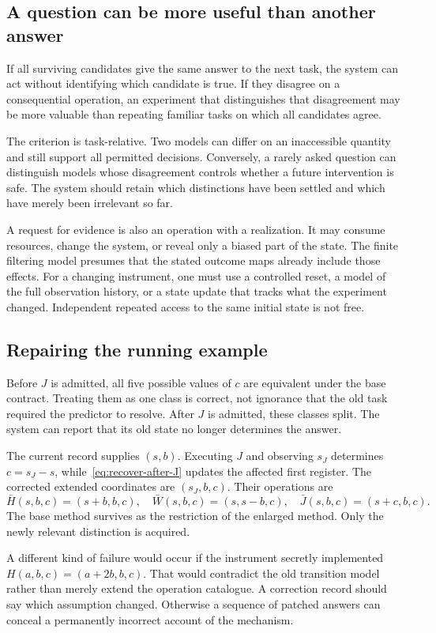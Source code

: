 \documentclass[11pt,letterpaper]{article}
\theoremstyle{plain}
\theoremstyle{definition}
\begin{document}
\subsection{A question can be more useful than another answer}
If all surviving candidates give the same answer to the next task, the system can act without identifying which candidate is true. If they disagree on a consequential operation, an experiment that distinguishes that disagreement may be more valuable than repeating familiar tasks on which all candidates agree.

The criterion is task-relative. Two models can differ on an inaccessible quantity and still support all permitted decisions. Conversely, a rarely asked question can distinguish models whose disagreement controls whether a future intervention is safe. The system should retain which distinctions have been settled and which have merely been irrelevant so far.

A request for evidence is also an operation with a realization. It may consume resources, change the system, or reveal only a biased part of the state. The finite filtering model presumes that the stated outcome maps already include those effects. For a changing instrument, one must use a controlled reset, a model of the full observation history, or a state update that tracks what the experiment changed. Independent repeated access to the same initial state is not free.

\subsection{Repairing the running example}
Before $J$ is admitted, all five possible values of $c$ are equivalent under the base contract. Treating them as one class is correct, not ignorance that the old task required the predictor to resolve. After $J$ is admitted, these classes split. The system can report that its old state no longer determines the answer.

The current record supplies $(s,b)$. Executing $J$ and observing $s_J$ determines $c=s_J-s$, while~\eqref{eq:recover-after-J} updates the affected first register. The corrected extended coordinates are $(s_J,b,c)$. Their operations are
\[
\bar H(s,b,c)=(s+b,b,c),\quad
\bar W(s,b,c)=(s,s-b,c),\quad
\bar J(s,b,c)=(s+c,b,c).
\]
The base method survives as the restriction of the enlarged method. Only the newly relevant distinction is acquired.

A different kind of failure would occur if the instrument secretly implemented $H(a,b,c)=(a+2b,b,c)$. That would contradict the old transition model rather than merely extend the operation catalogue. A correction record should say which assumption changed. Otherwise a sequence of patched answers can conceal a permanently incorrect account of the mechanism.
\end{document}

